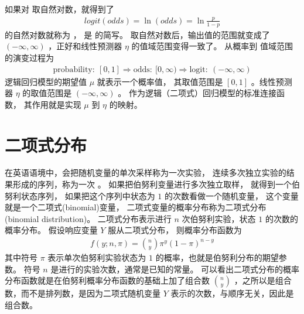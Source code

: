 \documentclass[letterpaper,10pt,english]{sphinxmanual}
\begin{document}
如果对  取自然对数，就得到了 
\begin{equation}\label{equation:二项模型/content:二项模型/content:21}
\begin{split}logit(odds) = \ln (odds) = \ln \frac{p}{1-p}\end{split}
\end{equation}
 的自然对数就称为 
， 是  的简写。
 取自然对数后，输出值的范围就变成了 \((-\infty,\infty)\)
，正好和线性预测器 \(\eta\) 的值域范围变得一致了。
从概率到  值域范围的演变过程为
\begin{equation}\label{equation:二项模型/content:二项模型/content:22}
\begin{split}\text{probability} : \  [0,1]
\Longrightarrow \text{odds} :\ [0,\infty)
\Longrightarrow \text{logit} :\  (-\infty,\infty)\end{split}
\end{equation}
逻辑回归模型的期望值 \(\mu\) 就表示一个概率值，
其取值范围是 \([0,1]\)
。线性预测器 \(\eta\)
的取值范围是 \((-\infty,\infty)\)
。  作为逻辑（二项式）回归模型的标准连接函数，
其作用就是实现 \(\mu\) 到 \(\eta\) 的映射。


\section{二项式分布}
\label{\detokenize{_u4e8c_u9879_u6a21_u578b/content:id6}}
在英语语境中，会把随机变量的单次采样称为一次实验，
连续多次独立实验的结果形成的序列，称为一次  。
如果把伯努利变量进行多次独立取样，
就得到一个伯努利状态序列，
如果把这个序列中状态为 \(1\) 的次数看做一个随机变量，
这个变量就是一个二项式(binomial)变量，
二项式变量的概率分布称为二项式分布(binomial distribution)。
二项式分布表示进行 \(n\) 次伯努利实验，状态 \(1\) 的次数的概率分布。
假设响应变量 \(Y\) 服从二项式分布，
则概率分布函数为
\begin{equation}\label{equation:二项模型/content:eq_binomial_300}
\begin{split}f(y;n,\pi) =\binom{n}{y} \pi^y(1-\pi)^{n-y}\end{split}
\end{equation}
其中符号 \(\pi\) 表示单次伯努利实验状态为 \(1\) 的概率，也就是伯努利分布的期望参数。
符号 \(n\) 是进行的实验次数，通常是已知的常量。
可以看出二项式分布的概率分布函数就是在伯努利概率分布函数的基础上加了组合数 \(\binom{n}{y}\)
，之所以是组合数，而不是排列数，是因为二项式随机变量 \(Y\)
表示的次数，与顺序无关，因此是组合数。
\end{document}
